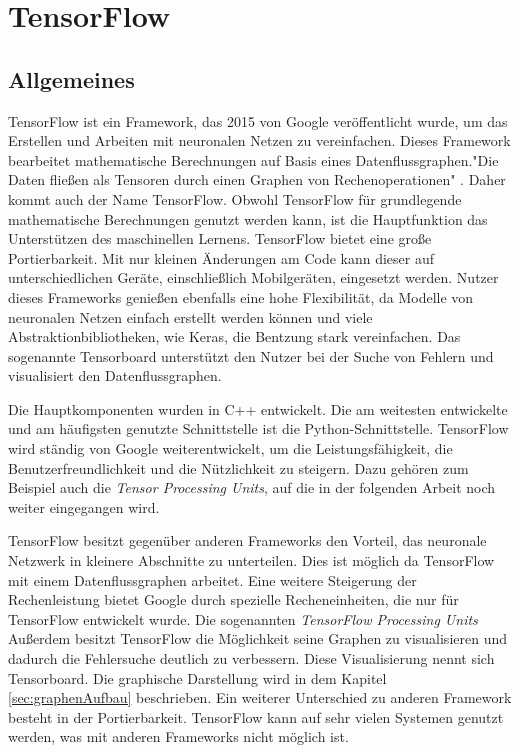 \chapter{TensorFlow}
\label{chap:tensorflow}
\section{Allgemeines}
\label{sec:allgemeines}
\printsubchapterauthor{\authorNiklas}
TensorFlow ist ein Framework, das 2015 von Google veröffentlicht wurde, um das Erstellen und Arbeiten mit neuronalen Netzen zu vereinfachen. Dieses Framework bearbeitet mathematische Berechnungen auf Basis eines Datenflussgraphen."Die Daten fließen als Tensoren durch einen Graphen von Rechenoperationen" \citep{Einfuehrung}. Daher kommt auch der Name TensorFlow. Obwohl TensorFlow für grundlegende mathematische Berechnungen genutzt werden kann, ist die Hauptfunktion das Unterstützen des maschinellen Lernens. TensorFlow bietet eine große Portierbarkeit. Mit nur kleinen Änderungen am Code kann dieser auf unterschiedlichen Geräte, einschließlich Mobilgeräten, eingesetzt werden. Nutzer dieses Frameworks genießen ebenfalls eine hohe Flexibilität, da Modelle von neuronalen Netzen einfach erstellt werden können und viele Abstraktionbibliotheken, wie Keras, die Bentzung stark vereinfachen. Das sogenannte Tensorboard unterstützt den Nutzer bei der Suche von Fehlern und visualisiert den Datenflussgraphen. \cite{Einfuehrung} 

Die Hauptkomponenten wurden in C++ entwickelt. Die am weitesten entwickelte und am häufigsten genutzte Schnittstelle ist die Python-Schnittstelle. TensorFlow wird ständig von Google weiterentwickelt, um die Leistungsfähigkeit, die Benutzerfreundlichkeit und die Nützlichkeit zu steigern. Dazu gehören zum Beispiel auch die \textit{Tensor Processing Units}, auf die in der folgenden Arbeit noch weiter eingegangen wird.

TensorFlow besitzt gegenüber anderen Frameworks den Vorteil, das neuronale Netzwerk in kleinere Abschnitte zu unterteilen. Dies ist möglich da TensorFlow mit einem Datenflussgraphen arbeitet. Eine weitere Steigerung der Rechenleistung bietet Google durch spezielle Recheneinheiten, die nur für TensorFlow entwickelt wurde. Die sogenannten \textit{TensorFlow Processing Units} Außerdem besitzt TensorFlow die Möglichkeit seine Graphen zu visualisieren und dadurch die Fehlersuche deutlich zu verbessern. Diese Visualisierung nennt sich Tensorboard. Die graphische Darstellung wird in dem Kapitel \ref{sec:graphenAufbau} beschrieben. Ein weiterer Unterschied zu anderen Framework besteht in der Portierbarkeit. TensorFlow kann auf sehr vielen Systemen genutzt werden, was mit anderen Frameworks nicht möglich ist.
